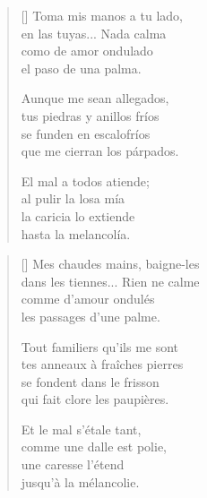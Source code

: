 



\settowidth{\versewidth}{Que me cierran los párpados.}

\bigskip

\begin{verse}[\versewidth]
  Toma mis manos a tu lado, \\
  en las tuyas... Nada calma \\
  como de amor ondulado \\
  el paso de una palma.

  Aunque me sean allegados, \\
  tus piedras y anillos fríos \\
  se funden en escalofríos \\
  que me cierran los párpados.

  El mal a todos atiende; \\
  al pulir la losa mía \\
  la caricia lo extiende \\
  hasta la melancolía.
\end{verse}

\newpage



\settowidth{\versewidth}{Dans les tiennes... Rien ne calme}

\bigskip

{\itshape
\begin{verse}[\versewidth]
  Mes chaudes mains, baigne-les \\
  dans les tiennes... Rien ne calme \\
  comme d'amour ondulés \\
  les passages d'une palme.

  Tout familiers qu'ils me sont \\
  tes anneaux à fraîches pierres \\
  se fondent dans le frisson \\
  qui fait clore les paupières.

  Et le mal s'étale tant, \\
  comme une dalle est polie, \\
  une caresse l'étend \\
  jusqu'à la mélancolie.
\end{verse}
}
